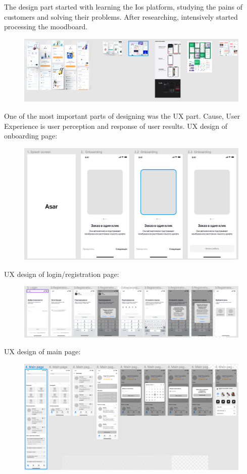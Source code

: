 The design part started with learning the Ios platform, studying the pains of customers and solving their problems. After researching, intensively started processing the moodboard.
\begin{figure}[H]
    \centering
    \includegraphics[scale=0.50]{images/design5.png}
\end{figure}
One of the most important parts of designing was the UX part. Cause, User Experience is user perception and response of user results. \newline
UX design of onboarding page:
\begin{figure}[H]
    \centering
    \includegraphics[scale=0.60]{images/design2.png}
\end{figure}
UX design of login/registration page:
\begin{figure}[H]
    \centering
    \includegraphics[scale=0.53]{images/design1.png}
\end{figure}
UX design of main page:
\begin{figure}[H]
    \centering
    \includegraphics[scale=0.59]{images/design3.png}
\end{figure}
